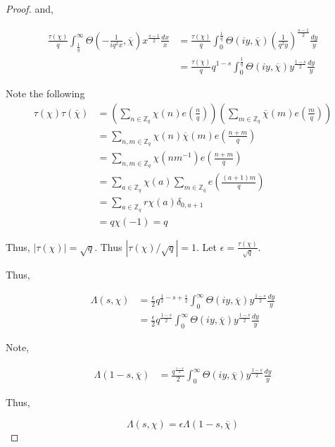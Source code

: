\documentclass{article}
\newcommand{\Z}{\mathbb{Z}}
\newcommand{\abs}[1]{\left\lvert #1\right\rvert}
\begin{document}
\begin{proof}
    and, 

    \begin{align*}
        \frac{\tau(\chi)}{q}\int_{\frac{1}{q}}^{\infty} \Theta\left(-\frac{1}{iq^2x}, \overline{\chi}\right)x^{\frac{s - 1}{2}} \frac{dx}{x} &= \frac{\tau(\chi)}{q}\int_{0}^{\frac{1}{q}} \Theta\left(iy, \overline{\chi}\right)\left(\frac{1}{q^2 y}\right)^{\frac{s - 1}{2}} \frac{dy}{y} \\
        &= \frac{\tau(\chi)}{q} q^{1 - s} \int_{0}^{\frac{1}{q}} \Theta\left(iy, \overline{\chi}\right)y^{\frac{1 - s}{2}} \frac{dy}{y}
    \end{align*}

    Note the following
    \begin{align*}
        \tau(\chi) \tau(\overline{\chi}) &= \left(\sum_{n \in \Z_q} \chi(n) e\left(\frac{n}{q}\right)\right)\left(\sum_{m \in \Z_q} \overline{\chi}(m) e\left(\frac{m}{q}\right)\right) \\
        &= \sum_{n, m \in \Z_q} \chi(n) \overline{\chi}(m) e\left(\frac{n + m}{q}\right) \\
        &= \sum_{n, m \in \Z_q} \chi(n m^{-1}) e\left(\frac{n + m}{q}\right) \\
        &= \sum_{a \in \Z_q} \chi(a) \sum_{m \in \Z_q} e\left(\frac{(a + 1)m}{q}\right) \\
        &= \sum_{a \in \Z_q} r\chi(a) \delta_{0, a + 1} \\
        &= q \chi(-1) = q
    \end{align*}

    Thus, $\abs{\tau(\chi)} = \sqrt{q}$. Thus $\abs{\tau(\chi)/\sqrt{q}} = 1$. Let $\epsilon = \frac{\tau(\chi)}{\sqrt{q}}$. 


    Thus, 

    \begin{align*}
        \Lambda(s, \chi) &= \frac{\epsilon}{2} q^{\frac{1}{2} - s + \frac{s}{2}} \int_{0}^{\infty} \Theta(iy, \overline{\chi}) y^{\frac{1 - s}{2}} \frac{dy}{y} \\
        &= \frac{\epsilon}{2} q^{\frac{1 - s}{2}} \int_{0}^{\infty} \Theta(iy, \overline{\chi}) y^{\frac{1 - s}{2}} \frac{dy}{y}
    \end{align*}

    Note, 

    \begin{align*}
        \Lambda(1 - s, \overline{\chi}) &= \frac{q^{\frac{1 - s}{2}}}{2} \int_{0}^{\infty} \Theta(iy, \overline{\chi}) y^{\frac{1 - s}{2}} \frac{dy}{y}
    \end{align*}

    Thus, 

    \[\Lambda(s, \chi) = \epsilon \Lambda(1 - s, \overline{\chi})\]

\end{proof}
\end{document}
